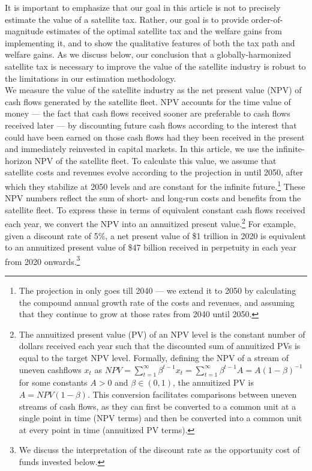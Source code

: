 \documentclass[12pt]{article}
\begin{document}
It is important to emphasize that our goal in this article is not to precisely estimate the value of a satellite tax. Rather, our goal is to provide order-of-magnitude estimates of the optimal satellite tax and the welfare gains from implementing it, and to show the qualitative features of both the tax path and welfare gains. As we discuss below, our conclusion that a globally-harmonized satellite tax is necessary to improve the value of the satellite industry is robust to the limitations in our estimation methodology.\\ 

We measure the value of the satellite industry as the net present value (NPV) of cash flows generated by the satellite fleet. NPV accounts for the time value of money --- the fact that cash flows received sooner are preferable to cash flows received later --- by discounting future cash flows according to the interest that could have been earned on those cash flows had they been received in the present and immediately reinvested in capital markets. In this article, we use the infinite-horizon NPV of the satellite fleet. To calculate this value, we assume that satellite costs and revenues evolve according to the projection in \citet{MSreport} until 2050, after which they stabilize at 2050 levels and are constant for the infinite future.\footnote{The projection in \citet{MSreport} only goes till 2040 --- we extend it to 2050 by calculating the compound annual growth rate of the costs and revenues, and assuming that they continue to grow at those rates from 2040 until 2050.} These NPV numbers reflect the sum of short- and long-run costs and benefits from the satellite fleet. To express these in terms of equivalent constant cash flows received each year, we convert the NPV into an annuitized present value.\footnote{The annuitized present value (PV) of an NPV level is the constant number of dollars received each year such that the discounted sum of annuitized PVs is equal to the target NPV level. Formally, defining the NPV of a stream of uneven cashflows $x_t$ as $NPV = \sum_{t=1}^{\infty} \beta^{t-1} x_t = \sum_{t=1}^{\infty} \beta^{t-1} A = A(1 - \beta)^{-1}$ for some constants $A>0$ and $\beta \in (0,1)$, the annuitized PV is $A = NPV(1-\beta)$. This conversion facilitates comparisons between uneven streams of cash flows, as they can first be converted to a common unit at a single point in time (NPV terms) and then be converted into a common unit at every point in time (annuitized PV terms).} For example, given a discount rate of 5\%, a net present value of \$1 trillion in 2020 is equivalent to an annuitized present value of \$47 billion received in perpetuity in each year from 2020 onwards.\footnote{We discuss the interpretation of the discount rate as the opportunity cost of funds invested below.} \\
\end{document}
